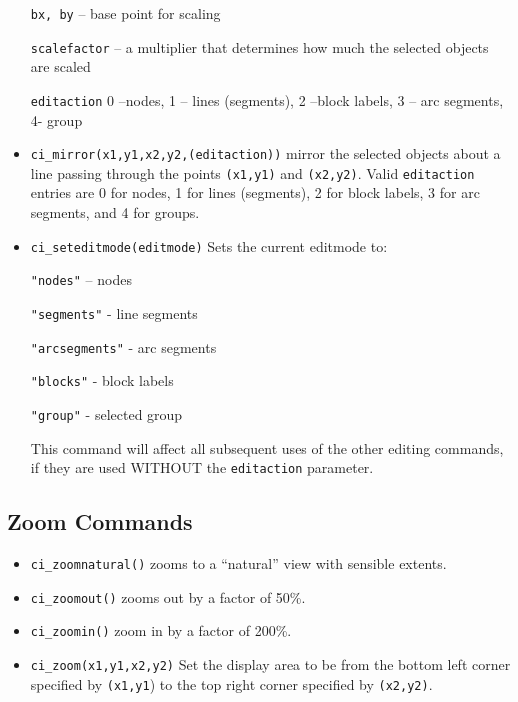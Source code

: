 \begin{itemize}
\texttt{bx, by} -- base point for scaling

\texttt{scalefactor} -- a multiplier that determines how much the selected
objects are scaled

\texttt{editaction} 0 --nodes, 1 -- lines (segments), 2 --block labels, 3 --
arc segments, 4- group

\item \texttt{ci\_mirror(x1,y1,x2,y2,(editaction))} mirror the selected objects about
a line passing through the points \texttt{(x1,y1)} and
\texttt{(x2,y2)}. Valid \texttt{editaction} entries are 0 for
nodes, 1 for lines (segments), 2 for block labels, 3 for arc
segments, and 4 for groups.

\item \texttt{ci\_seteditmode(editmode)} Sets the current editmode to:

\texttt{"nodes"} -- nodes

\texttt{"segments"} - line segments

\texttt{"arcsegments"} - arc segments

\texttt{"blocks"} - block labels

\texttt{"group"} - selected group

This command will affect all subsequent uses of the other editing
commands, if they are used WITHOUT the \texttt{editaction}
parameter.
\end{itemize}

\subsection{Zoom Commands}

\begin{itemize}
\item \texttt{ci\_zoomnatural()} zooms to a ``natural'' view with sensible extents.

\item \texttt{ci\_zoomout()} zooms out by a factor of 50{\%}.

\item \texttt{ci\_zoomin()} zoom in by a factor of 200{\%}.

\item \texttt{ci\_zoom(x1,y1,x2,y2)} Set the display area to be from the bottom left
corner specified by \texttt{(x1,y1}) to the top right corner
specified by \texttt{(x2,y2)}.
\end{itemize}

